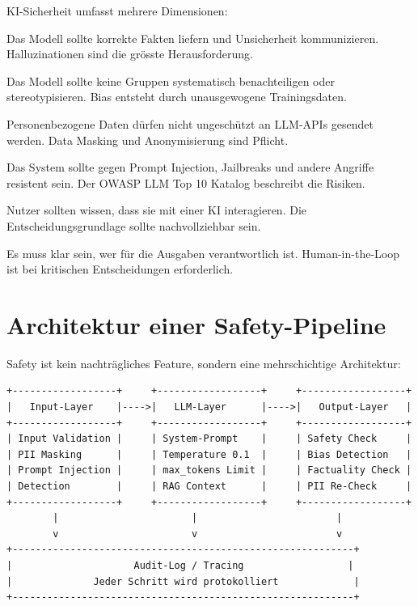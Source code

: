 KI-Sicherheit umfasst mehrere Dimensionen:

\begin{description}[leftmargin=*,style=nextline]
    \item[Factuality] Das Modell sollte korrekte Fakten liefern und Unsicherheit kommunizieren. Halluzinationen sind die grösste Herausforderung.
    \item[Fairness / Bias] Das Modell sollte keine Gruppen systematisch benachteiligen oder stereotypisieren. Bias entsteht durch unausgewogene Trainingsdaten.
    \item[Privacy] Personenbezogene Daten dürfen nicht ungeschützt an LLM-APIs gesendet werden. Data Masking und Anonymisierung sind Pflicht.
    \item[Security] Das System sollte gegen Prompt Injection, Jailbreaks und andere Angriffe resistent sein. Der OWASP LLM Top 10 Katalog beschreibt die Risiken.
    \item[Transparency] Nutzer sollten wissen, dass sie mit einer KI interagieren. Die Entscheidungsgrundlage sollte nachvollziehbar sein.
    \item[Accountability] Es muss klar sein, wer für die Ausgaben verantwortlich ist. Human-in-the-Loop ist bei kritischen Entscheidungen erforderlich.
\end{description}

\section{Architektur einer Safety-Pipeline}

Safety ist kein nachträgliches Feature, sondern eine mehrschichtige Architektur:

\begin{verbatim}
+------------------+     +------------------+     +------------------+
|   Input-Layer    |---->|   LLM-Layer      |---->|   Output-Layer   |
+------------------+     +------------------+     +------------------+
| Input Validation |     | System-Prompt    |     | Safety Check     |
| PII Masking      |     | Temperature 0.1  |     | Bias Detection   |
| Prompt Injection |     | max_tokens Limit |     | Factuality Check |
| Detection        |     | RAG Context      |     | PII Re-Check     |
+------------------+     +------------------+     +------------------+
        |                       |                        |
        v                       v                        v
+-----------------------------------------------------------+
|                     Audit-Log / Tracing                  |
|              Jeder Schritt wird protokolliert             |
+-----------------------------------------------------------+
\end{verbatim}

